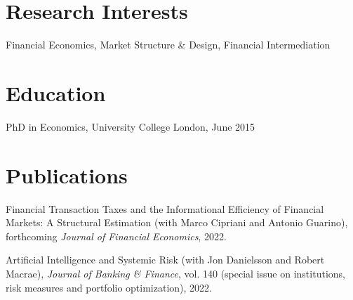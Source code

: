 \documentclass[margin,line, 11pt]{res}
\newenvironment{list1}{
  \begin{list}{\ding{113}}{%
      \setlength{\itemsep}{0in}
      \setlength{\parsep}{0in} \setlength{\parskip}{0in}
      \setlength{\topsep}{0in} \setlength{\partopsep}{0in} 
      \setlength{\leftmargin}{0.17in}}}{\end{list}}
\begin{document}
\begin{resume}
\section{\sc Research Interests}
\begin{list1}
\item[] Financial Economics, Market Structure \& Design, Financial Intermediation
\end{list1}

\section{\sc Education}

\begin{list1}
\item[] PhD in Economics, University College London, June 2015
\vspace*{0.2cm}

\end{list1}

\section{\sc Publications}
\begin{list1}
\item[] Financial Transaction Taxes and the Informational Efficiency of 
Financial Markets: A Structural Estimation (with Marco Cipriani and Antonio Guarino), forthcoming \textit{Journal of Financial Economics}, 2022.
\vspace*{0.2cm}
\item[] Artificial Intelligence and Systemic Risk (with Jon Danielsson and Robert Macrae), \textit{Journal of Banking \& Finance}, vol. 140 (special issue on institutions, risk measures and portfolio optimization), 2022.
\end{list1}


\end{resume}
\end{document}
